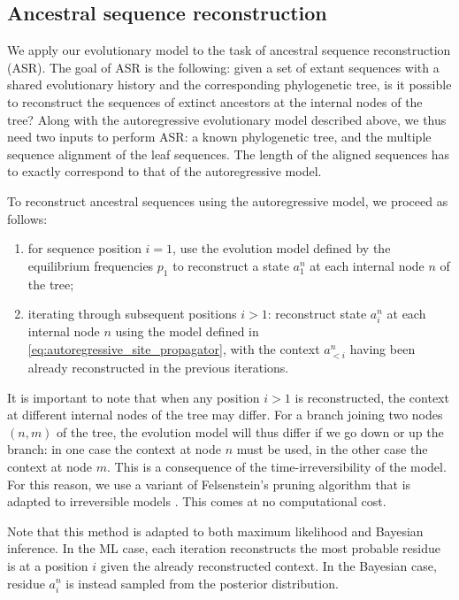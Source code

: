 \subsection{Ancestral sequence reconstruction}

We apply our evolutionary model to the task of ancestral sequence reconstruction (ASR). 
The goal of ASR is the following: given a set of extant sequences with a shared evolutionary history and the corresponding phylogenetic tree, is it possible to reconstruct the sequences of extinct ancestors at the internal nodes of the tree? 
Along with the autoregressive evolutionary model described above, we thus need two inputs to perform ASR: a known phylogenetic tree, and the multiple sequence alignment of the leaf sequences. 
The length of the aligned sequences has to exactly correspond to that of the autoregressive model. 

To reconstruct ancestral sequences using the autoregressive model, we proceed as follows: 
\begin{enumerate}[label=\emph{\roman*}]	
	\item for sequence position $i=1$, use the evolution model defined by the equilibrium frequencies $p_1$ to reconstruct a state $a^n_1$ at each internal node $n$ of the tree;
	\item iterating through subsequent positions $i > 1$: reconstruct state $a^n_i$ at each internal node $n$ using the model defined in \eqref{eq:autoregressive_site_propagator}, with the context $a^n_{<i}$ having been already reconstructed in the previous iterations. 
\end{enumerate}
It is important to note that when any position $i>1$ is reconstructed, the context at different internal nodes of the tree may differ. 
For a branch joining two nodes $(n, m)$ of the tree, the evolution model will thus differ if we go down or up the branch: in one case the context at node $n$ must be used, in the other case the context at node $m$. 
This is a consequence of the time-irreversibility of the model. 
For this reason, we use a variant of Felsenstein's pruning algorithm that is adapted to irreversible models \cite{boussau_efficientlikelihoodcomputations_2006}. 
This comes at no computational cost. 

Note that this method is adapted to both maximum likelihood and Bayesian inference. 
In the ML case, each iteration reconstructs the most probable residue is at a position $i$ given the already reconstructed context. 
In the Bayesian case, residue $a^n_i$ is instead sampled from the posterior distribution. 

